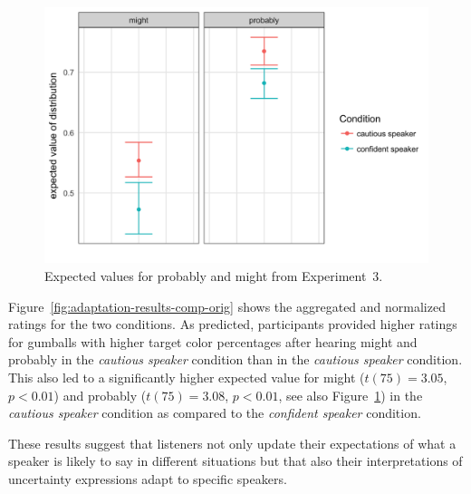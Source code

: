 \documentclass[man, floatsintext]{apa6}
\begin{document}
\begin{figure}[h!]
\includegraphics[width=.75\textwidth]{plots/adaptation-diff-comprehension.png}
\caption{Expected values for {\sc probably} and {\sc might} from Experiment~3.  \label{fig:adaptation-exp-comp}}
\end{figure}


Figure~\ref{fig:adaptation-results-comp-orig} shows the aggregated and normalized ratings for the two conditions.  As predicted, participants provided higher ratings for gumballs with higher target color percentages after hearing {\sc might} and {\sc probably} in the \emph{cautious speaker} condition than in the \emph{cautious speaker} condition. This also led to a significantly higher expected value for {\sc might} ($t(75)=3.05$, $p<0.01$) and {\sc probably} ($t(75)=3.08$, $p<0.01$, see also Figure~\ref{fig:adaptation-exp-comp}) in the \emph{cautious speaker} condition as compared to the \emph{confident speaker} condition.

These results suggest that listeners not only update their expectations of what a speaker is likely to say in different situations but that also their interpretations of uncertainty expressions adapt to specific speakers.
\end{document}
